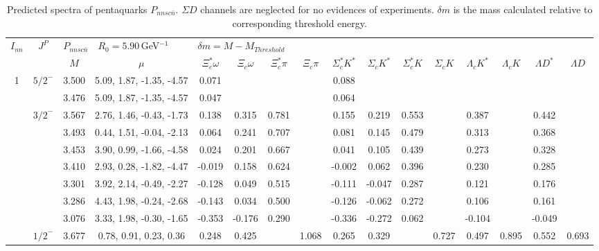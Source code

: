 \documentclass[prd,twocolumn,floatfix,nofootinbib]{revtex4}
\begin{document}
\renewcommand{\tabcolsep}{0.09cm}
\renewcommand{\arraystretch}{1.0}
\begin{table*}[!htbp]
    \caption{Predicted spectra of pentaquarks $P_{nnsc\bar{n}}$.
        $\Sigma D$ channels are neglected for no evidences of experiments.
        $\delta m$ is the mass calculated relative to corresponding threshold energy.}
    \label{tab:nnscn}
    \begin{tabular}{cc|cc|cccccccccccc}
        \bottomrule[1.5pt]\bottomrule[0.5pt]
        \multirow{2}{*}{$I_{nn}$} &\multirow{2}{*}{$J^{P}$} 
        &\multicolumn{2}{l|}{$P_{nnsc\bar{n}}\quad R_{0}=5.90\,$GeV$^{-1}$}
        &\multicolumn{12}{l}{$\delta m=M-M_{Threshold}$} \\
        & &$M$ &$\mu$ &$\Xi_{c}^{\ast}\omega$ &$\Xi_{c}\omega$ &$\Xi_{c}^{\ast}\pi$ &$\Xi_{c}\pi$ 
        &$\Sigma_{c}^{\ast}K^{\ast}$ &$\Sigma_{c}K^{\ast}$ &$\Sigma_{c}^{\ast}K$ &$\Sigma_{c}K$  
        &$\Lambda_{c}K^{\ast}$ &$\Lambda_{c}K$ &$\Lambda D^{\ast}$ &$\Lambda D$ \\ \hline
        1
            &${5/2}^{-}$    &3.500  &5.09, 1.87, -1.35, -4.57 &0.071 & & & &0.088 & & & & & & & \\
            &               &3.476  &5.09, 1.87, -1.35, -4.57 &0.047 & & & &0.064 & & & & & & & \\
            &${3/2}^{-}$    &3.567  &2.76, 1.46, -0.43, -1.73 &0.138 &0.315 &0.781 & &0.155 &0.219 &0.553 & &0.387 & &0.442 & \\
            &               &3.493  &0.44, 1.51, -0.04, -2.13 &0.064 &0.241 &0.707 & &0.081 &0.145 &0.479 & &0.313 & &0.368 & \\
            &               &3.453  &3.90, 0.99, -1.66, -4.58 &0.024 &0.201 &0.667 & &0.041 &0.105 &0.439 & &0.273 & &0.328 & \\
            &               &3.410  &2.93, 0.28, -1.82, -4.47 &-0.019 &0.158 &0.624 & &-0.002 &0.062 &0.396 & &0.230 & &0.285 & \\
            &               &3.301  &3.92, 2.14, -0.49, -2.27 &-0.128 &0.049 &0.515 & &-0.111 &-0.047 &0.287 & &0.121 & &0.176 & \\
            &               &3.286  &4.43, 1.98, -0.24, -2.68 &-0.143 &0.034 &0.500 & &-0.126 &-0.062 &0.272 & &0.106 & &0.161 & \\
            &               &3.076  &3.33, 1.98, -0.30, -1.65 &-0.353 &-0.176 &0.290 & &-0.336 &-0.272 &0.062 & &-0.104 & &-0.049 & \\
            &${1/2}^{-}$    &3.677  &0.78, 0.91, 0.23, 0.36 &0.248 &0.425 & &1.068 &0.265 &0.329 & &0.727 &0.497 &0.895 &0.552 &0.693 \\

\end{tabular}
\end{table*}
\end{document}
